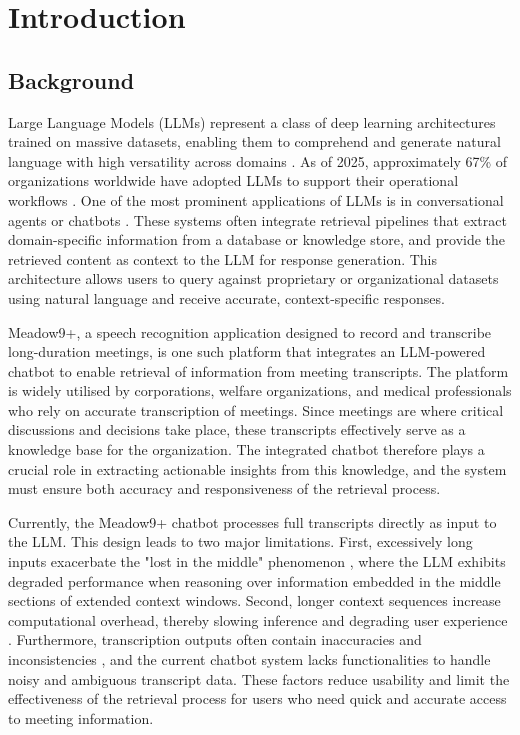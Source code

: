 \chapter{Introduction}
\section{Background}
Large Language Models (LLMs) represent a class of deep learning architectures trained on massive datasets, enabling them to comprehend and generate natural language with high versatility across domains \cite{shao2024survey}. As of 2025, approximately 67\% of organizations worldwide have adopted LLMs to support their operational workflows \cite{hostinger2025llm}. One of the most prominent applications of LLMs is in conversational agents or chatbots \cite{dam2024complete}. These systems often integrate retrieval pipelines \cite{gao2024retrieval} that extract domain-specific information from a database or knowledge store, and provide the retrieved content as context to the LLM for response generation. This architecture allows users to query against proprietary or organizational datasets using natural language and receive accurate, context-specific responses.

Meadow9+, a speech recognition application designed to record and transcribe long-duration meetings, is one such platform that integrates an LLM-powered chatbot to enable retrieval of information from meeting transcripts. The platform is widely utilised by corporations, welfare organizations, and medical professionals who rely on accurate transcription of meetings. Since meetings are where critical discussions and decisions take place, these transcripts effectively serve as a knowledge base for the organization. The integrated chatbot therefore plays a crucial role in extracting actionable insights from this knowledge, and the system must ensure both accuracy and responsiveness of the retrieval process.

Currently, the Meadow9+ chatbot processes full transcripts directly as input to the LLM. This design leads to two major limitations. First, excessively long inputs exacerbate the "lost in the middle" phenomenon \cite{liu2024lost}, where the LLM exhibits degraded performance when reasoning over information embedded in the middle sections of extended context windows. Second, longer context sequences increase computational overhead, thereby slowing inference and degrading user experience \cite{nvidia2023mastering}. Furthermore, transcription outputs often contain inaccuracies and inconsistencies \cite{metzger2024measuring}, and the current chatbot system lacks functionalities to handle noisy and ambiguous transcript data. These factors reduce usability and limit the effectiveness of the retrieval process for users who need quick and accurate access to meeting information.

